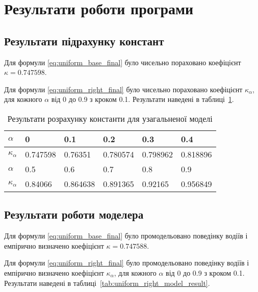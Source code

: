 \section{Результати роботи програми}
\label{sec:result_analyse}
\jointitles
\subsection{Результати підрахунку констант}

Для формули \eqref{eq:uniform_base_final} було чисельно пораховано коефіцієнт $\kappa=0.747598$.

Для формули \eqref{eq:uniform_right_final} було чисельно пораховано коефіцієнт $\kappa_\alpha$, для кожного $\alpha$ від 0 до 0.9 з кроком 0.1. Результати наведені в таблиці~\ref{tab:uniform_right_integral_result}.

\begin{table}[ht]
	\caption{Результати розрахунку константи для узагальненої моделі}
	\centering
\begin{tabular}{|p{}|p{}|p{}|p{}|p{}|p{}|}
	\hline
	$\alpha$ & 0 & 0.1 & 0.2 & 0.3 & 0.4 \\
	\hline
	$\kappa_\alpha$ & 0.747598 &0.76351 &0.780574 &0.798962 &0.818896  \\
	\hline
	\hline
	$\alpha$  & 0.5 & 0.6 & 0.7 & 0.8 & 0.9\\
	\hline
	$\kappa_\alpha$  &0.84066 &0.864638 &0.891365 &0.92165 &0.956849 \\
	\hline
\end{tabular}	
	\label{tab:uniform_right_integral_result}
\end{table}

\subsection{Результати роботи моделера}

Для формули \eqref{eq:uniform_base_final} було промодельовано поведінку водіїв і емпірично визначено коефіцієнт $\kappa=0.747588$.

Для формули \eqref{eq:uniform_right_final} було промодельовано поведінку водіїв і емпірично визначено коефіцієнт $\kappa_\alpha$, для кожного $\alpha$ від 0 до 0.9 з кроком 0.1. Результати наведені в таблиці~\ref{tab:uniform_right_model_result}.

